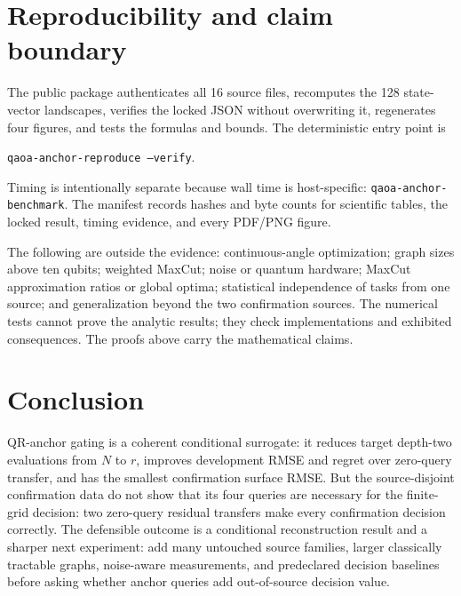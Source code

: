 \documentclass[10pt,letterpaper,twoside]{article}
\begin{document}
\section{Reproducibility and claim boundary}

The public package authenticates all 16 source files, recomputes the 128
state-vector landscapes, verifies the locked JSON without overwriting it,
regenerates four figures, and tests the formulas and bounds.  The deterministic
entry point is
\begin{center}
\texttt{qaoa-anchor-reproduce --verify}.
\end{center}
Timing is intentionally separate because wall time is host-specific:
\texttt{qaoa-anchor-benchmark}.  The manifest records hashes and byte counts
for scientific tables, the locked result, timing evidence, and every PDF/PNG
figure.

The following are outside the evidence:
continuous-angle optimization; graph sizes above ten qubits; weighted MaxCut;
noise or quantum hardware; MaxCut approximation ratios or global optima;
statistical independence of tasks from one source; and generalization beyond
the two confirmation sources.  The numerical tests cannot prove the analytic
results; they check implementations and exhibited consequences.  The proofs
above carry the mathematical claims.

\section{Conclusion}

QR-anchor gating is a coherent conditional surrogate: it reduces target
depth-two evaluations from $N$ to $r$, improves development RMSE and regret
over zero-query transfer, and has the smallest confirmation surface RMSE.
But the source-disjoint confirmation data do not show that its four queries
are necessary for the finite-grid decision: two zero-query residual transfers
make every confirmation decision correctly.  The defensible outcome is a
conditional reconstruction result and a sharper next experiment: add many
untouched source families, larger classically tractable graphs, noise-aware
measurements, and predeclared decision baselines before asking whether anchor
queries add out-of-source decision value.



\end{document}
